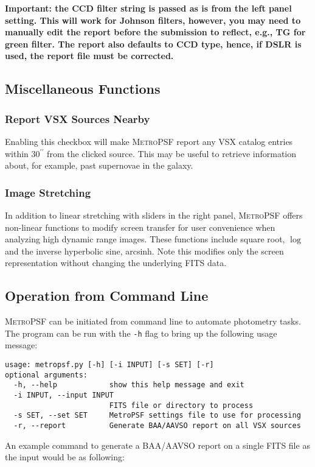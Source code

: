 \documentclass{article}
\newcommand\arcsec{\mbox{$^{\prime\prime}$}}%
\begin{document}
\textbf{Important: the CCD filter string is passed as is from the left panel setting. This will work for Johnson filters, however, you may need to manually edit the report before the submission to reflect, e.g., TG for green filter. The report also defaults to CCD type, hence, if DSLR is used, the report file must be corrected.}

\subsection{Miscellaneous Functions}
\subsubsection{Report VSX Sources Nearby}
Enabling this checkbox will make \textsc{MetroPSF} report any VSX catalog entries within {30\arcsec} from the clicked source. This may be useful to retrieve information about, for example, past supernovae in the galaxy. 

\subsubsection{Image Stretching}
In addition to linear stretching with sliders in the right panel, \textsc{MetroPSF} offers non-linear functions to modify screen transfer for user convenience when analyzing high dynamic range images. These functions include square root, $\log$ and the inverse hyperbolic sine, arcsinh. Note this modifies only the screen representation without changing the underlying FITS data.

\subsection{Operation from Command Line}
\textsc{MetroPSF} can be initiated from command line to automate photometry tasks. The program can be run with the \texttt{-h} flag to bring up the following usage message: 
\begin{verbatim}
usage: metropsf.py [-h] [-i INPUT] [-s SET] [-r]
optional arguments:
  -h, --help            show this help message and exit
  -i INPUT, --input INPUT
                        FITS file or directory to process
  -s SET, --set SET     MetroPSF settings file to use for processing
  -r, --report          Generate BAA/AAVSO report on all VSX sources
\end{verbatim}

An example command to generate a BAA/AAVSO report on a single FITS file as the input would be as following:
\end{document}
